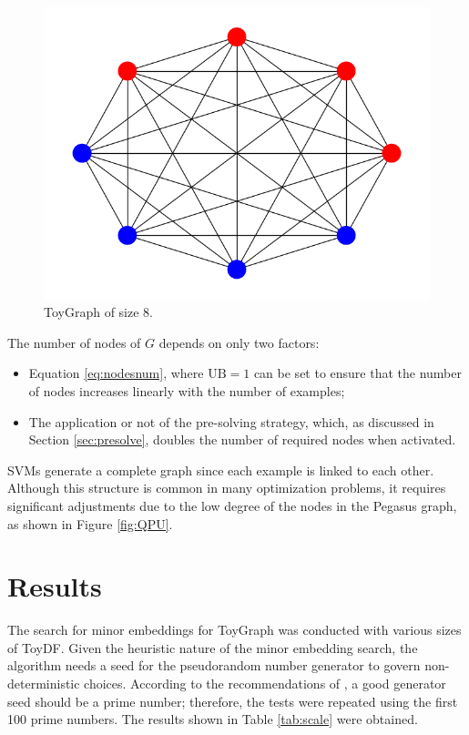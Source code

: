 \begin{figure}[H]
    \centering
    \includegraphics[scale=0.5]{figures/toygraph.png}
    \caption{ToyGraph of size $8$.}
    \label{fig:toydfgraph}
\end{figure}

The number of nodes of $G$ depends on only two factors:

\begin{itemize} 
	\item Equation \eqref{eq:nodesnum}, where $\text{UB} = 1$ can be set to ensure that the number of nodes increases linearly with the number of examples; 
	\item The application or not of the pre-solving strategy, which, as discussed in Section \ref{sec:presolve}, doubles the number of required nodes when activated. 
\end{itemize}

SVMs generate a complete graph since each example is linked to each other. 
Although this structure is common in many optimization problems, it requires significant adjustments due to the low degree of the nodes in the Pegasus graph, as shown in Figure \ref{fig:QPU}.

\section{Results}\label{sec:qpu-res}

The search for minor embeddings for ToyGraph was conducted with various sizes of ToyDF. 
Given the heuristic nature of the minor embedding search, the algorithm needs a seed for the pseudorandom number generator to govern non-deterministic choices. 
According to the recommendations of \cite{random}, a good generator seed should be a prime number; therefore, the tests were repeated using the first 100 prime numbers.
The results shown in Table \ref{tab:scale} were obtained.


